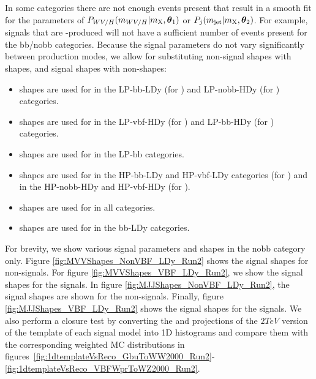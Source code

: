 In some categories there are not enough events present that result in a smooth fit for the parameters of $P_{WV/H}(m_{WV/H}|m_\mathrm{X},\vb*{\theta}_1)$ or $P_j(m_\mathrm{jet}|m_\mathrm{X},\vb*{\theta}_2)$.
For example, signals that are \VBF-produced will not have a sufficient number of events present for the bb/nobb categories.
Because the signal parameters do not vary significantly between production modes, we allow for substituting non-\VBF signal shapes with \VBF shapes, and \VBF signal shapes with non-\VBF shapes:
\begin{itemize}
  \item \DY\WprtoWZ shapes are used for \VBF\WprtoWZ in the LP-bb-LDy (for \MJ) and LP-nobb-HDy (for \MVV) categories.
  \item \VBF\WprtoWZ shapes are used for \DY\WprtoWZ in the LP-vbf-HDy (for \MJ) and LP-bb-HDy (for \MVV) categories.
  \item \ggF\RadtoWW shapes are used for \VBF\RadtoWW in the LP-bb categories.
  \item \ggF\GBulktoWW shapes are used for \VBF\GBulktoWW in the HP-bb-LDy and HP-vbf-LDy categories (for \MJ) and in the HP-nobb-HDy and HP-vbf-HDy (for \MVV).
  \item \ggF\GBulktoWW shapes are used for \DY\ZprtoWW in all categories.
  \item \ggF\GBulktoWW shapes are used for \VBF\ZprtoWW in the bb-LDy categories.
\end{itemize}

For brevity, we show various signal parameters and shapes in the nobb category only.
Figure \ref{fig:MVVShapes_NonVBF_LDy_Run2} shows the \MVV signal shapes for non-\VBF signals.
For figure \ref{fig:MVVShapes_VBF_LDy_Run2}, we show the \MVV signal shapes for the \VBF signals.
In figure \ref{fig:MJJShapes_NonVBF_LDy_Run2}, the \MJ signal shapes are shown for the non-\VBF signals.
Finally, figure \ref{fig:MJJShapes_VBF_LDy_Run2} shows the \MJ signal shapes for the \VBF signals.
We also perform a closure test by converting the \MVV and \MJ projections of the $2\unit{TeV}$ version of the template of each signal model into 1D histograms and compare them with the corresponding weighted MC distributions in figures~\ref{fig:1dtemplateVsReco_GbuToWW2000_Run2}-\ref{fig:1dtemplateVsReco_VBFWprToWZ2000_Run2}.

